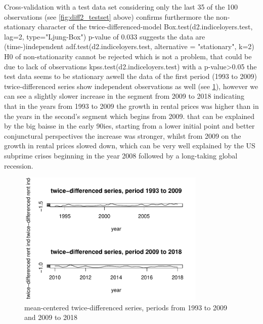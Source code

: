 \documentclass[11pt,a4paper]{article}
\begin{document}
Cross-validation with a test data set considering only the last 35 of the 100 observations (see \cref{fig:diff2_testset} above) confirms furthermore the non-stationary character of the twice-differenced-model 
Box.test(d2.indiceloyers.test, lag=2, type="Ljung-Box") p-value of 0.033 suggests the data are (time-)independent
adf.test(d2.indiceloyers.test, alternative = "stationary", k=2)  H0 of non-stationarity cannot be rejected which is not a problem, that could be due to lack of observations
kpss.test(d2.indiceloyers.test)  with a p-value>0.05 the test data seems to be stationary aswell
the data of the first period (1993 to 2009) twice-differenced series show independent observations as well (see \cref{fig:diff2_test_train}), however we can see a slightly slower increase in the segment from 2009 to 2018 indicating that in the years from 1993 to 2009 the growth in rental prices was higher than in the years in the second's segment which begins from 2009. that can be explained by the big baisse in the early 90ies, starting from a lower initial point and better conjunctural perspectives the increase was stronger, whilst from 2009 on the growth in rental prices slowed down, which can be very well explained by the US subprime crises beginning in the year 2008 followed by a long-taking global recession.

\begin{figure}
    \centering
    \includegraphics[angle=0,width=0.8\textwidth]{diff2_test_train}
    \caption{mean-centered twice-differenced series, periods from 1993 to 2009 and 2009 to 2018}
    \label{fig:diff2_test_train}
\end{figure}
\end{document}
